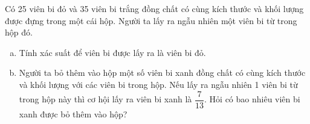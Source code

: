 \begin{bt}%
Có 25 viên bi đỏ và 35 viên bi trắng đồng chất có cùng kích thước và khối lượng được đựng trong một cái hộp. Người ta lấy ra ngẫu nhiên một viên bi từ trong hộp đó.
\begin{enumerate}[a)]
    \item Tính xác suất để viên bi được lấy ra là viên bi đỏ.
    \item Người ta bỏ thêm vào hộp một số viên bi xanh đồng chất có cùng kích thước và khối lượng với các viên bi trong hộp. Nếu lấy ra ngẫu nhiên 1 viên bi từ trong hộp này thì cơ hội lấy ra viên bi xanh là $\dfrac{7}{13}$. Hỏi có bao nhiêu viên bi xanh được bỏ thêm vào hộp?
\end{enumerate}
\end{bt}

